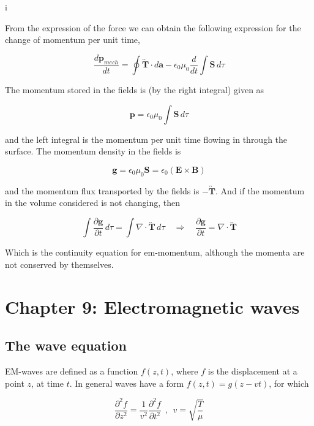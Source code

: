 i\documentclass[a4paper]{article}
\begin{document}
From the expression of the force we can obtain the following expression for the change of momentum per unit time,

\begin{equation}
    \frac{d\bm{p}_{mech}}{dt}=\oint \overleftrightarrow{\bm{T}}\cdot d\bm{a}-\epsilon_0\mu_0\frac{d}{dt}\int\bm{S}\,d\tau
\end{equation}

The momentum stored in the fields is (by the right integral) given as

\begin{equation}
    \bm{p}=\epsilon_0\mu_0\int\bm{S}\,d\tau
\end{equation}

and the left integral is the momentum per unit time flowing in through the surface. The momentum density in the fields is

\begin{equation}
    \bm{g}=\epsilon_0\mu_0\bm{S}=\epsilon_0(\bm{E}\times\bm{B})
\end{equation}

and the momentum flux transported by the fields is $-\overleftrightarrow{\bm{T}}$. And if the momentum in the volume considered is not changing, then

\begin{equation}
    \int\frac{\partial \bm{g}}{\partial t}\,d\tau=\int\nabla\cdot\overleftrightarrow{\bm{T}}\,d\tau\quad\Rightarrow\quad \frac{\partial \bm{g}}{\partial t}=\nabla\cdot\overleftrightarrow{\bm{T}}
\end{equation}

Which is the continuity equation for em-momentum, although the momenta are not conserved by themselves. 

\section{Chapter 9: Electromagnetic waves}

\subsection{The wave equation}

EM-waves are defined as a function $f(z, t)$, where $f$ is the displacement at a point $z$, at time $t$. In general waves have a form $f(z, t)=g(z-vt)$, for which

\begin{equation}
    \frac{\partial^2 f}{\partial z^2}=\frac{1}{v^2}\frac{\partial^2 f}{\partial t^2} \ \ , \ \ v=\sqrt{\frac{T}{\mu}}
\end{equation}
\end{document}
